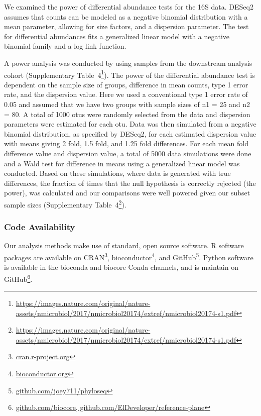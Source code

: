We examined the power of differential abundance tests for the 16S data. DESeq2 \cite{Love2014} assumes that counts can be modeled as a negative binomial distribution with a mean parameter, allowing for size factors, and a dispersion parameter. The test for differential abundances fits a generalized linear model with a negative binomial family and a log link function. 

A power analysis was conducted by using samples from the downstream analysis cohort (Supplementary Table~4\footnote{\url{https://images.nature.com/original/nature-assets/nmicrobiol/2017/nmicrobiol20174/extref/nmicrobiol20174-s1.pdf}}). The power of the differential abundance test is dependent on the sample size of groups, difference in mean counts, type 1 error rate, and the dispersion value. Here we used a conventional type 1 error rate of 0.05 and assumed that we have two groups with sample sizes of n1 = 25 and n2 = 80. A total of 1000 \glspl{otu} were randomly selected from the data and dispersion parameters were estimated for each \gls{otu}. Data was then simulated from a negative binomial distribution, as specified by DESeq2, for each estimated dispersion value with means giving 2 fold, 1.5 fold, and 1.25 fold differences. For each mean fold difference value and dispersion value, a total of 5000 data simulations were done and a Wald test for difference in means using a generalized linear model was conducted. Based on these simulations, where data is generated with true differences, the fraction of times that the null hypothesis is correctly rejected (the power), was calculated and our comparisons were well powered given our subset sample sizes (Supplementary  Table~4\footnote{\url{https://images.nature.com/original/nature-assets/nmicrobiol/2017/nmicrobiol20174/extref/nmicrobiol20174-s1.pdf}}). 

\subsubsection{Code Availability}

Our analysis methods make use of standard, open source software. R software 
packages are available on CRAN\footnote{\url{cran.r-project.org}}, 
bioconductor\footnote{\url{bioconductor.org}}, and 
GitHub\footnote{\url{github.com/joey711/phyloseq}}. Python software is 
available in the bioconda and biocore Conda channels, and is maintain on 
GitHub\footnote{\url{github.com/biocore, 
github.com/ElDeveloper/reference-plane}}.
